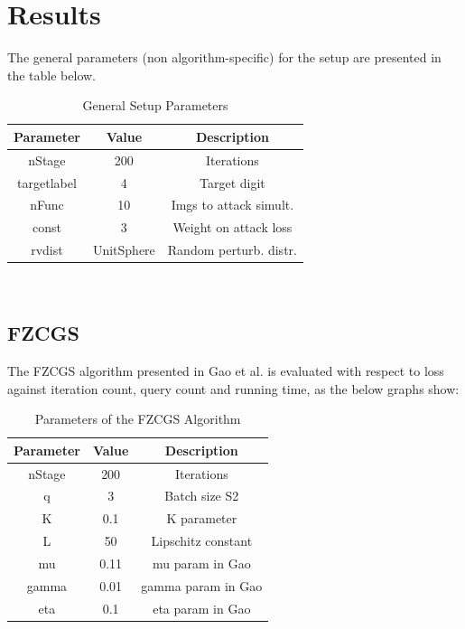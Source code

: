 \documentclass[10pt,twocolumn,letterpaper]{article}
\begin{document}
\section{Results}

The general parameters (non algorithm-specific) for the setup are presented in the table below.

\begin{table}[h]
   \centering
   \begin{tabular}{ccc}
       \hline
       Parameter & Value & Description \\
       \hline
       nStage & 200 & Iterations\\
       \hline
       targetlabel & 4 & Target digit\\
       \hline
       nFunc & 10 & Imgs to attack simult.\\
       \hline
       const & 3 & Weight on attack loss\\
       \hline
       rvdist & UnitSphere & Random perturb. distr.\\ 
       \hline
   \end{tabular}
   \
   \caption{General Setup Parameters} 
   \label{tab:general_params}
\end{table}

\subsection{FZCGS}

The FZCGS algorithm presented in Gao et al. is evaluated with respect to 
loss against iteration count, query count and running time, as the below graphs show:

\begin{table}[h]
   \centering
   \begin{tabular}{ccc}
       \hline
       Parameter & Value & Description \\
       \hline
       nStage & 200 & Iterations\\
       \hline
       q & 3 & Batch size S2\\
       \hline
       K & 0.1 & K parameter\\
       \hline
       L & 50 & Lipschitz constant \\
       \hline
       mu & 0.11 & mu param in Gao\\
       \hline
       gamma & 0.01 & gamma param in Gao\\
       \hline
       eta & 0.1 & eta param in Gao\\
       \hline
   \end{tabular}
   \
   \caption{Parameters of the FZCGS Algorithm} 
   \label{tab:fzcgs_params}
\end{table}
\end{document}
